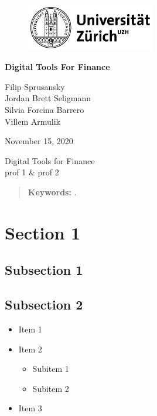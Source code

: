 \documentclass[a4paper,12pt]{article}
\begin{document}
	
	\begin{titlepage}
		\centering
		\begin{figure}[!h]
			\centering
			\includegraphics[width=0.5\textwidth]{UZH}
		\end{figure}
		\Large{\textbf{Digital Tools For Finance}\\}

		
		\vfill 
		
		\large{Filip Sprusansky \\ 
				Jordan Brett Seligmann \\
				Silvia Forcina Barrero\\
				Villem Armulik}
		
		\vfill
			
		\large{November 15, 2020}
		
		\vfill
		\vfill
	
		\large{Digital Tools for Finance \\prof 1 \& prof 2 \\ }
	
		\vfill
		\begin{abstract}
		\noindent
			\blindtext
			
			\vspace{3mm}
			
			\textbf{Keywords:} .
		\end{abstract}
		
		
	\end{titlepage}
	
	
	\clearpage
	\tableofcontents
	
	\clearpage
	\listoffigures
	
	\clearpage
	\listoftables
	\clearpage	
	
	\section{Section 1}
	\subsection{Subsection 1}
    \blindtext
    \subsection{Subsection 2}
    \blindtext
    \begin{itemize}
    	\item Item 1
    	\item Item 2
    	\begin{itemize}
    		\item Subitem 1
    		\item Subitem 2
    	\end{itemize}
    	\item Item 3
    \end{itemize}
\end{document}
